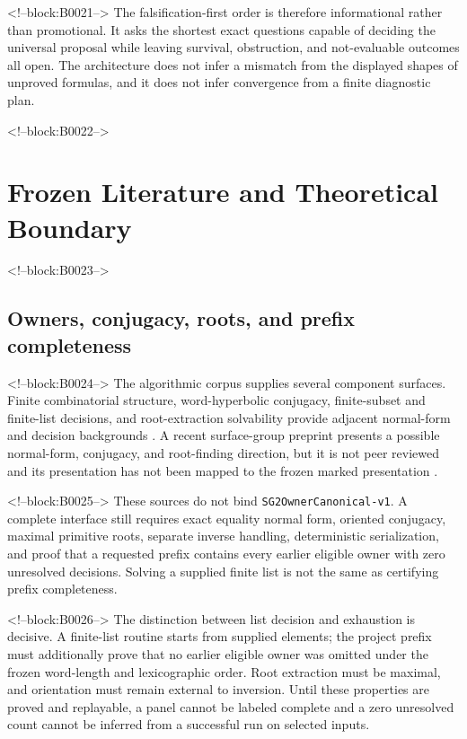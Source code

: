 \documentclass[11pt]{article}
\begin{document}
<!--block:B0021-->
The falsification-first order is therefore informational rather than
promotional. It asks the shortest exact questions capable of deciding
the universal proposal while leaving survival, obstruction, and
not-evaluable outcomes all open. The architecture does not infer a
mismatch from the displayed shapes of unproved formulas, and it does not
infer convergence from a finite diagnostic plan.

<!--block:B0022-->
\hypertarget{2-frozen-literature-and-theoretical-boundary}{%
\section{Frozen Literature and Theoretical
Boundary}\label{2-frozen-literature-and-theoretical-boundary}}

<!--block:B0023-->
\hypertarget{21-owners-conjugacy-roots-and-prefix-completeness}{%
\subsection{Owners, conjugacy, roots, and prefix
completeness}\label{21-owners-conjugacy-roots-and-prefix-completeness}}

<!--block:B0024-->
The algorithmic corpus supplies several component surfaces. Finite
combinatorial structure, word-hyperbolic conjugacy, finite-subset and
finite-list decisions, and root-extraction solvability provide adjacent
normal-form and decision backgrounds
\citep{P32-S01,P32-S02,P32-S03,P32-S04,P32-S05}.
A recent surface-group preprint presents a possible normal-form,
conjugacy, and root-finding direction, but it is not peer reviewed and
its presentation has not been mapped to the frozen marked presentation
\citep{P32-S06}.

<!--block:B0025-->
These sources do not bind \texttt{SG2OwnerCanonical-v1}. A complete
interface still requires exact equality normal form, oriented conjugacy,
maximal primitive roots, separate inverse handling, deterministic
serialization, and proof that a requested prefix contains every earlier
eligible owner with zero unresolved decisions. Solving a supplied finite
list is not the same as certifying prefix completeness.

<!--block:B0026-->
The distinction between list decision and exhaustion is decisive. A
finite-list routine starts from supplied elements; the project prefix
must additionally prove that no earlier eligible owner was omitted
under the frozen word-length and lexicographic order. Root extraction
must be maximal, and orientation must remain external to inversion.
Until these properties are proved and replayable, a panel cannot be
labeled complete and a zero unresolved count cannot be inferred from a
successful run on selected inputs.
\end{document}
